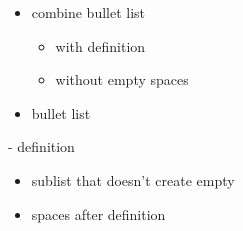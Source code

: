\documentclass[]{article}
\providecommand{\tightlist}{%
  \setlength{\itemsep}{0pt}\setlength{\parskip}{0pt}}
\begin{document}
\begin{itemize}
\tightlist
\item
  combine bullet list

  \begin{itemize}
  \tightlist
  \item
    with definition
  \end{itemize}


  \begin{itemize}
  \tightlist
  \item
    without empty spaces
  \end{itemize}
\end{itemize}

\begin{itemize}
\tightlist
\item
  bullet list
\end{itemize}

\begin{description}
\tightlist
\item[]
- definition

\begin{itemize}
\tightlist
\item
  sublist that doesn't create empty
\item
  spaces after definition
\end{itemize}
\end{description}
\end{document}
